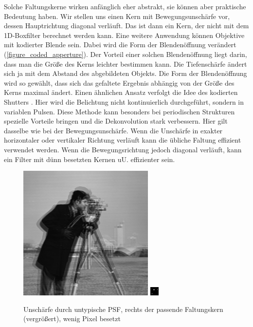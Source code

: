 \documentclass[a4paper,12pt]{article}
\begin{document}
Solche Faltungskerne wirken anfänglich eher abstrakt, sie können aber praktische
Bedeutung haben. Wir stellen uns einen Kern mit Bewegungsunschärfe vor, dessen
Hauptrichtung diagonal verläuft. Das ist dann ein Kern, der nicht mit dem
1D-Boxfilter berechnet werden kann. Eine weitere Anwendung können Objektive mit
kodierter Blende sein. Dabei wird die Form der Blendenöffnung verändert
(\ref{figure_coded_apperture}). Der Vorteil einer solchen Blendenöffnung liegt
darin, dass man die Größe des Kerns leichter bestimmen kann. Die Tiefenschärfe
ändert sich ja mit dem Abstand des abgebildeten Objekts. Die Form der
Blendenöffnung wird so gewählt, dass sich das gefaltete Ergebnis abhängig von der Größe des Kerns
maximal ändert. Einen ähnlichen Ansatz verfolgt die Idee des kodierten Shutters
\cite{coded_shutter}. Hier wird die Belichtung nicht kontinuierlich 
durchgeführt, sondern in variablen Pulsen. Diese Methode kann besonders bei
periodischen Strukturen spezielle Vorteile bringen und die Dekonvolution stark
verbessern. Hier gilt dasselbe wie bei der Bewegungsunschärfe. Wenn die
Unschärfe in exakter horizontaler oder vertikaler Richtung verläuft kann die
übliche Faltung effizient verwendet werden. Wenn die Bewegungsrichtung jedoch
diagonal verläuft, kann ein Filter mit dünn besetzten Kernen uU. effizienter
sein.






\begin{figure}[htbp]
\centering
\includegraphics[scale=0.8]{out_krumm17.png}
\includegraphics[scale=5]{krumm17.png}
\caption{Unschärfe durch untypische PSF, rechts der passende Faltungskern
(vergrößert), wenig Pixel besetzt}%
\label{figure_duenn}
\end{figure}
\end{document}
